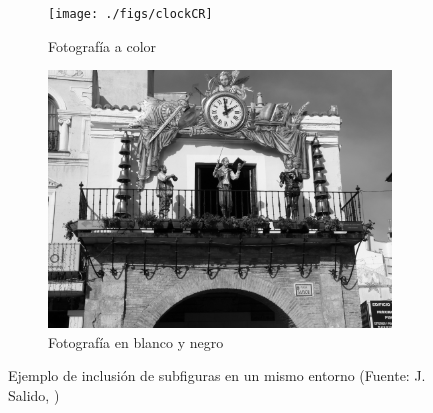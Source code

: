 \begin{figure}[H] %
	\centering
	\begin{subfigure}[b]{0.4\linewidth}
		\centering
		\texttt{[image: ./figs/clockCR]}
		\caption{Fotografía a color}\label{fig:fotocolor}
	\end{subfigure} 
	\begin{subfigure}[b]{0.4\linewidth}
		\centering
		\includegraphics[width=0.8\linewidth]{./figs/clockCRbw}
		\caption{Fotografía en blanco y negro}\label{fig:fotoBW}
	\end{subfigure} 
	\caption[Ejemplo de subfiguras]{Ejemplo de inclusión de subfiguras en un mismo entorno (Fuente: J. Salido, \faCreativeCommons{} \faCreativeCommonsBy{} \faCreativeCommonsNcEu{} \faCreativeCommonsNd)}
	\label{fig:ejSubfigures}
\end{figure}

